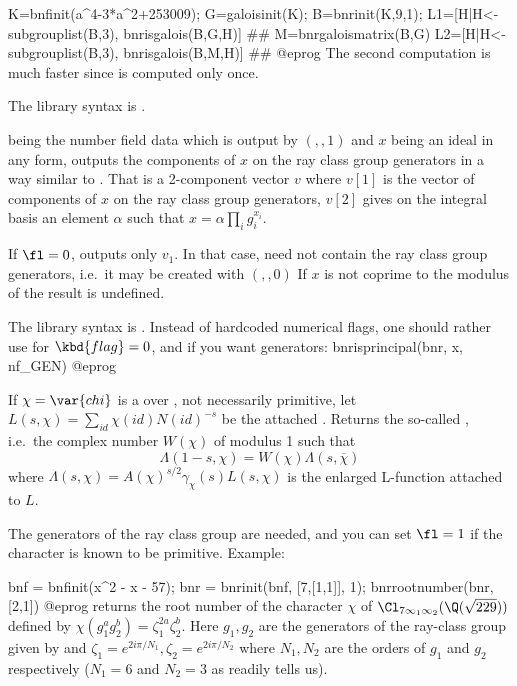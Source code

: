 \bprog
K=bnfinit(a^4-3*a^2+253009);
G=galoisinit(K);
B=bnrinit(K,9,1);
L1=[H|H<-subgrouplist(B,3), bnrisgalois(B,G,H)]
##
M=bnrgaloismatrix(B,G)
L2=[H|H<-subgrouplist(B,3), bnrisgalois(B,M,H)]
##
@eprog
The second computation is much faster since  is
computed only once.

The library syntax is .

\label{se:bnrisprincipal}
 being the
number field data which is output by $(,,1)$ and $x$ being an
ideal in any form, outputs the components of $x$ on the ray class group
generators in a way similar to . That is a 2-component
vector $v$ where $v[1]$ is the vector of components of $x$ on the ray class
group generators, $v[2]$ gives on the integral basis an element $\alpha$ such
that $x=\alpha\prod_ig_i^{x_i}$.

If $\fl=0$, outputs only $v_1$. In that case,  need not contain the
ray class group generators, i.e.~it may be created with $(,,0)$
If $x$ is not coprime to the modulus of  the result is undefined.

The library syntax is .
Instead of hardcoded  numerical flags,  one should rather
use
 for $\kbd{flag} = 0$, and if you
want generators:
\bprog
  bnrisprincipal(bnr, x, nf_GEN)
@eprog

\label{se:bnrrootnumber}
If $\chi=\var{chi}$ is a
 over , not necessarily primitive, let
$L(s,\chi) = \sum_{id} \chi(id) N(id)^{-s}$ be the attached
. Returns the so-called , i.e.~the
complex number $W(\chi)$ of modulus 1 such that
%
$$\Lambda(1-s,\chi) = W(\chi) \Lambda(s,\overline{\chi})$$
%
\noindent where $\Lambda(s,\chi) = A(\chi)^{s/2}\gamma_\chi(s) L(s,\chi)$ is
the enlarged L-function attached to $L$.

The generators of the ray class group are needed, and you can set $\fl=1$ if
the character is known to be primitive. Example:

\bprog
bnf = bnfinit(x^2 - x - 57);
bnr = bnrinit(bnf, [7,[1,1]], 1);
bnrrootnumber(bnr, [2,1])
@eprog\noindent
returns the root number of the character $\chi$ of
$\Cl_{7\infty_1\infty_2}(\Q(\sqrt{229}))$ defined by $\chi(g_1^ag_2^b)
= \zeta_1^{2a}\zeta_2^b$. Here $g_1, g_2$ are the generators of the
ray-class group given by  and $\zeta_1 = e^{2i\pi/N_1},
\zeta_2 = e^{2i\pi/N_2}$ where $N_1, N_2$ are the orders of $g_1$ and
$g_2$ respectively ($N_1=6$ and $N_2=3$ as  readily tells us).

